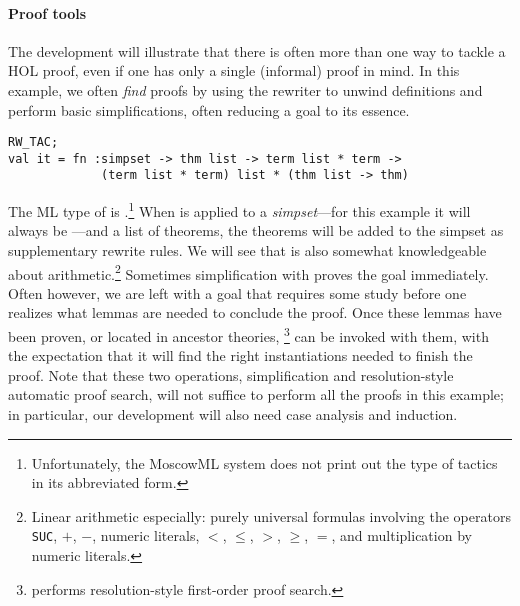 \paragraph{Proof tools}
The development will illustrate that there is often more than one way to
tackle a HOL proof, even if one has only a single (informal) proof in
mind. In this example, we often \emph{find} proofs by using 
the rewriter  to unwind definitions and perform basic 
simplifications, often reducing a goal to its essence.
\begin{session}
\begin{verbatim}
RW_TAC;
val it = fn :simpset -> thm list -> term list * term -> 
             (term list * term) list * (thm list -> thm)
\end{verbatim}
\end{session}
The ML type of  is 
.\footnote{Unfortunately, the MoscowML system does not print out
the type of tactics in its abbreviated form.} 
When  is applied to a \textit{simpset}---for this example it will 
always be ---and a list of theorems, the
theorems will be added to the simpset as supplementary rewrite rules. 
We will see that  is also somewhat knowledgeable about
arithmetic.\footnote{Linear arithmetic especially: purely universal
formulas involving the operators {\tt SUC}, $+$, $-$, numeric
literals, $<$, $\leq$, $>$, $\geq$, $=$, and multiplication by numeric
literals.}
Sometimes simplification with  proves the goal immediately. 
Often however, we are left with a goal that requires some study before one
realizes what lemmas are needed to conclude the proof. Once these lemmas
have been proven, or located in ancestor theories, 
\footnote{
performs resolution-style first-order proof search.} can
be invoked with them, with the expectation that it will find the right
instantiations needed to finish the proof. Note that these two operations,
simplification and resolution-style automatic proof search, will not suffice to 
perform all the proofs in this example; in particular, our development will 
also need case analysis and induction.

